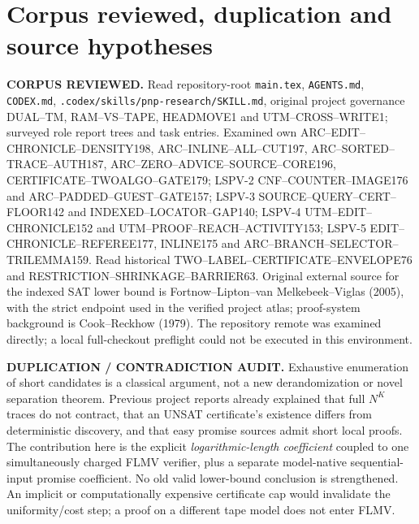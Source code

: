 \documentclass[11pt]{article}
\begin{document}
\section{Corpus reviewed, duplication and source hypotheses}
\noindent\textbf{CORPUS REVIEWED.}
Read repository-root \texttt{main.tex}, \texttt{AGENTS.md},
\texttt{CODEX.md}, \texttt{.codex/skills/pnp-research/SKILL.md},
original project governance DUAL--TM, RAM--VS--TAPE,
HEADMOVE1 and UTM--CROSS--WRITE1; surveyed role report trees and
task entries. Examined own ARC--EDIT--CHRONICLE--DENSITY198,
ARC--INLINE--ALL--CUT197, ARC--SORTED--TRACE--AUTH187,
ARC--ZERO--ADVICE--SOURCE--CORE196, CERTIFICATE--TWOALGO--GATE179;
LSPV-2 CNF--COUNTER--IMAGE176 and ARC--PADDED--GUEST--GATE157;
LSPV-3 SOURCE--QUERY--CERT--FLOOR142 and
INDEXED--LOCATOR--GAP140;
LSPV-4 UTM--EDIT--CHRONICLE152 and UTM--PROOF--REACH--ACTIVITY153;
LSPV-5 EDIT--CHRONICLE--REFEREE177, INLINE175 and
ARC--BRANCH--SELECTOR--TRILEMMA159. Read historical
TWO--LABEL--CERTIFICATE--ENVELOPE76 and
RESTRICTION--SHRINKAGE--BARRIER63.
Original external source for the indexed SAT lower bound is
Fortnow--Lipton--van Melkebeek--Viglas (2005), with the
strict endpoint used in the verified project atlas; proof-system
background is Cook--Reckhow (1979).
The repository remote was examined directly; a local full-checkout
preflight could not be executed in this environment.

\noindent\textbf{DUPLICATION / CONTRADICTION AUDIT.}
Exhaustive enumeration of short candidates is a classical argument, not
a new derandomization or novel separation theorem. Previous project
reports already explained that full $N^K$ traces do not contract,
that an UNSAT certificate's existence differs from deterministic
discovery, and that easy promise sources admit short local proofs.
The contribution here is the explicit \emph{logarithmic-length
coefficient} coupled to one simultaneously charged FLMV verifier,
plus a separate model-native sequential-input promise coefficient.
No old valid lower-bound conclusion is strengthened.
An implicit or computationally expensive certificate cap would invalidate the
uniformity/cost step; a proof on a different tape model does not enter FLMV.
\end{document}
